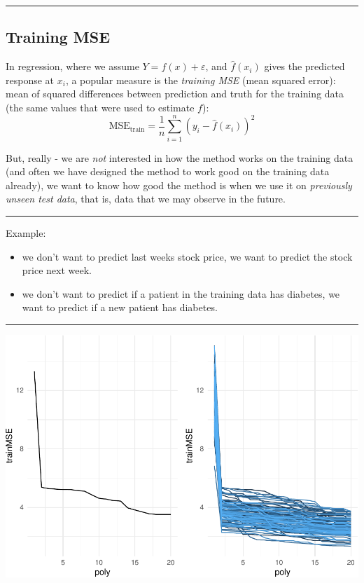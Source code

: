 \documentclass[]{article}
\providecommand{\tightlist}{%
  \setlength{\itemsep}{0pt}\setlength{\parskip}{0pt}}
\begin{document}
\begin{center}\rule{0.5\linewidth}{\linethickness}\end{center}

\hypertarget{training-mse}{%
\subsection{Training MSE}\label{training-mse}}

In regression, where we assume \(Y = f(x) + \varepsilon\), and
\(\hat{f}(x_i)\) gives the predicted response at \(x_i\), a popular
measure is the \emph{training MSE} (mean squared error): mean of squared
differences between prediction and truth for the training data (the same
values that were used to estimate \(f\)):
\[ \text{MSE}_{\text{train}}=\frac{1}{n}\sum_{i=1}^n (y_i-\hat{f}(x_i))^2\]

But, really - we are \emph{not} interested in how the method works on
the training data (and often we have designed the method to work good on
the training data already), we want to know how good the method is when
we use it on \emph{previously unseen test data}, that is, data that we
may observe in the future.

\begin{center}\rule{0.5\linewidth}{\linethickness}\end{center}

Example:

\begin{itemize}
\tightlist
\item
  we don't want to predict last weeks stock price, we want to predict
  the stock price next week.
\item
  we don't want to predict if a patient in the training data has
  diabetes, we want to predict if a new patient has diabetes.
\end{itemize}

\begin{center}\rule{0.5\linewidth}{\linethickness}\end{center}

\includegraphics{2StatLearn_files/figure-latex/trainMSE-1.pdf}
\end{document}
